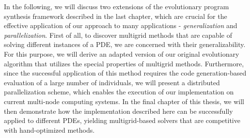In the following, we will discuss two extensions of the evolutionary program synthesis framework described in the last chapter, which are crucial for the effective application of our approach to many applications - \emph{generalization} and \emph{parallelization}.  
First of all, to discover multigrid methods that are capable of solving different instances of a PDE, we are concerned with their generalizability.
For this purpose, we will derive an adapted version of our original evolutionary algorithm that utilizes the special properties of multigrid methods.
Furthermore, since the successful application of this method requires the code generation-based evaluation of a large number of individuals, we will present a distributed parallelization scheme, which enables the execution of our implementation on current multi-node computing systems.
In the final chapter of this thesis, we will then demonstrate how the implementation described here can be successfully applied to different PDEs, yielding multigrid-based solvers that are competitive with hand-optimized methods. 

